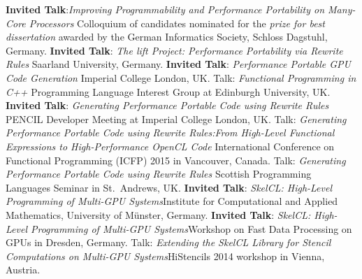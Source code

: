 \documentclass[11pt,a4paper]{moderncv}
\begin{document}
         {\textbf{Invited Talk}:\newline \emph{Improving Programmability and Performance Portability on Many-Core Processors}\newline
         \small Colloquium of candidates nominated for the \emph{prize for best dissertation} awarded by the German Informatics Society, Schloss Dagstuhl, Germany.}
         {\textbf{Invited Talk}: \emph{The lift Project: Performance Portability via Rewrite Rules}\newline
          \small Saarland University, Germany.}
         {\textbf{Invited Talk}: \emph{Performance Portable GPU Code Generation}\newline
         \small Imperial College London, UK.}
         {Talk: \emph{Functional Programming in C++}\newline
         \small Programming Language Interest Group at Edinburgh University, UK.}
         {\textbf{Invited Talk}: \emph{Generating Performance Portable Code using Rewrite Rules}\newline
         \small PENCIL Developer Meeting at Imperial College London, UK.}
         {Talk: \emph{Generating Performance Portable Code using Rewrite Rules:\newline From High-Level Functional Expressions to High-Performance OpenCL Code}\newline
         \small International Conference on Functional Programming (ICFP) 2015 in Vancouver, Canada.}
         {Talk: \emph{Generating Performance Portable Code using Rewrite Rules}\newline
         \small Scottish Programming Languages Seminar in St.\ Andrews, UK.}
         {\textbf{Invited Talk}: \emph{SkelCL\@: High-Level Programming of Multi-GPU
          Systems}\newline \small Institute for Computational and Applied
          Mathematics, University of Münster, Germany.}
         {\textbf{Invited Talk}: \emph{SkelCL\@: High-Level Programming of Multi-GPU
          Systems}\newline \small Workshop on Fast Data Processing on GPUs in
          Dresden, Germany.}
         {Talk: \emph{Extending the SkelCL Library for Stencil
          Computations on Multi-GPU Systems}\newline \small HiStencils 2014
          workshop in Vienna, Austria.}
\end{document}
